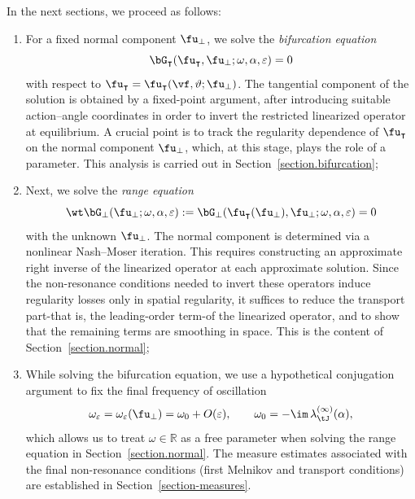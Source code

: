 \documentclass[a4paper,reqno,10pt]{article}
\begin{document}
In the next sections, we proceed as follows:
\begin{enumerate}
	\item For a fixed normal component $\fu_{\perp}$, we solve the
	{\it{bifurcation equation}}
	\begin{equation}
		\bG_{\intercal}(\fu_{\intercal},\fu_{\perp};\omega,\alpha,\varepsilon)=0
	\end{equation}
	with respect to $\fu_{\intercal}=\fu_{\intercal}(\vf,\vartheta;\fu_{\perp})$.
	The tangential component of the solution is obtained by a fixed-point argument,
	after introducing suitable action--angle coordinates in order to invert the
	restricted linearized operator at equilibrium. A crucial point is to track the
	regularity dependence of $\fu_{\intercal}$ on the normal component $\fu_{\perp}$, which, at this stage, 
	plays  the role of a parameter. This analysis is carried out in
	Section~\ref{section.bifurcation};
	\item Next, we solve the {\it{range equation}}
	\begin{equation}\label{bifurcation.eq}
		\wt\bG_{\perp}(\fu_{\perp};\omega,\alpha,\varepsilon) := \bG_{\perp}(\fu_{\intercal}(\fu_{\perp}),\fu_{\perp};\omega,\alpha,\varepsilon) = 0 
	\end{equation}
	with the unknown $\fu_{\perp}$. The normal component is determined
	via a nonlinear Nash--Moser iteration. This requires constructing an approximate
	right inverse of the linearized operator at each approximate solution. Since the
	non-resonance conditions needed to invert these operators induce regularity losses only in
	spatial regularity, it suffices to reduce the transport part-that is, the
	leading-order term-of the linearized operator, and to show that the remaining
	terms are  smoothing in space. This is the content of Section~\ref{section.normal};
	\item While solving the bifurcation equation, we use a hypothetical conjugation argument to
	fix the final frequency of oscillation
	\begin{equation}
		\omega_{\varepsilon}
		=\omega_{\varepsilon}(\fu_{\perp})
		=\omega_{0}+O(\varepsilon),
		\qquad
		\omega_{0}=-\im\,\lambda_{\tJ}^{(\infty)}(\alpha),
	\end{equation}
	which allows us to treat $\omega\in\mathbb{R}$ as a free parameter when solving
	the range equation in Section~\ref{section.normal}. The measure estimates
	associated with the final non-resonance conditions (first Melnikov and transport
	conditions) are established in Section~\ref{section-measures}.
\end{enumerate}
\end{document}
